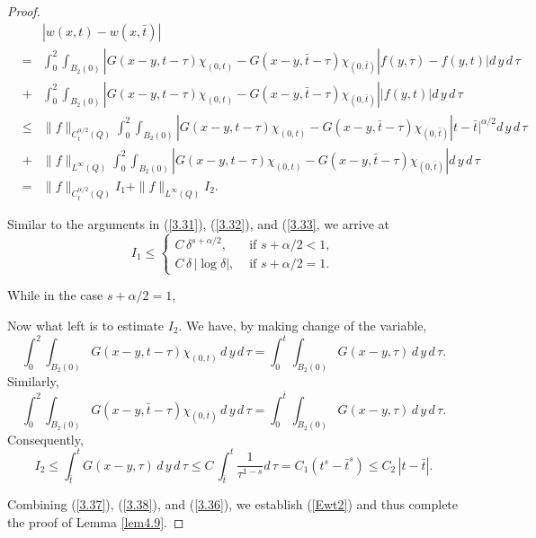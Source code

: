 \documentclass[12pt]{article}
\theoremstyle{remark}
\numberwithin{equation}{section}
\begin{document}
\begin{proof}
\begin{eqnarray}
&  & | w(x,t) - w(x, \bar{t}) | \nonumber \\
& = & \int_0^2 \int_{B_2(0)} \left| G(x-y, t-\tau) \chi_{(0,t)} - G(x-y, \bar{t} - \tau) \chi_{(0, \bar{t})} \right| f(y,\tau)-f(y,t)|  d \, y \, d \, \tau \nonumber \\
& + & \int_0^2 \int_{B_2(0)} \left| G(x-y, t-\tau) \chi_{(0,t)} - G(x-y, \bar{t} - \tau) \chi_{(0, \bar{t})} \right| |f(y,t)|  d \, y \, d \, \tau \nonumber \\
& \leq & \|f\|_{C_t^{\alpha/2}(Q)} \int_0^2 \int_{B_2(0)} \left| G(x-y, t-\tau) \chi_{(0,t)} - G(x-y, \bar{t} - \tau) \chi_{(0, \bar{t})} \right|t-\bar{t}|^{\alpha/2}  d \, y \, d \, \tau \nonumber \\
& + & \|f\|_{L^\infty (Q)} \int_0^2 \int_{B_2(0)} \left| G(x-y, t-\tau) \chi_{(0,t)} - G(x-y, \bar{t} - \tau) \chi_{(0, \bar{t})} \right|  d \, y \, d \, \tau \nonumber \\
& = & \|f\|_{C_t^{\alpha/2}(Q)} I_1 + \|f\|_{L^\infty (Q)} I_2 .
\label{3.36}
\end{eqnarray}

 Similar to the arguments in (\ref{3.31}), (\ref{3.32}), and (\ref{3.33}, we arrive at
\begin{equation}
I_1 \leq \left\{\begin{array}{ll} C \, \delta^{s + \alpha/2}, & \mbox{ if } s + \alpha /2 <1, \\
C \, \delta \, |\log \delta|, & \mbox{ if } s + \alpha /2 =1.
\end{array}
\right.
\label{3.37}
\end{equation}

While in the case $s + \alpha /2 =1$,

Now what left is to estimate $I_2$. We have, by making change of the variable,
$$
\int_0^2 \int_{B_2(0)} G(x-y, t-\tau) \chi_{(0,t)} \, d \, y \, d \, \tau = \int_0^t \int_{B_2(0)} G(x-y, \tau) \, d \, y \, d \, \tau.
$$
Similarly,
$$
\int_0^2 \int_{B_2(0)} G(x-y, \bar{t}-\tau) \chi_{(0,\bar{t})} \, d \, y \, d \, \tau = \int_0^{\bar{t}} \int_{B_2(0)} G(x-y, \tau) \, d \, y \, d \, \tau.
$$
Consequently,
\begin{equation}
I_2 \leq \int_{\bar{t}}^t G(x-y, \tau) \,d \, y \, d \, \tau \leq C \, \int_{\bar{t}}^t \frac{1}{\tau^{1-s}} d \, \tau = C_1 (t^s - \bar{t}^s) \leq C_2 \, |t-\bar{t}|.
\label{3.38}
\end{equation}

Combining (\ref{3.37}), (\ref{3.38}), and (\ref{3.36}), we establish (\ref{Ewt2}) and thus complete the proof of Lemma \ref{lem4.9}.
\end{proof}
\end{document}
